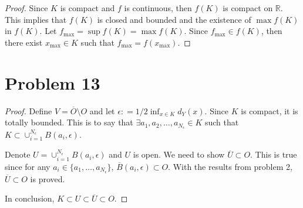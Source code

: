 \documentclass[12pt]{article}
\begin{document}
\begin{proof}

Since $K$ is compact and $f$ is continuous, then $f(K)$ is compact on $\mathbb R$. This implies that $f(K)$ is closed and bounded and the existence of $\max{f(K)}$ in $f(K)$. Let $f_{\text{max}} = \sup{f(K)} = \max {f(K)}$. Since $f_{\text{max}} \in f(K)$, then there exist $x_{\text{max}}\in K$ such that $f_{\text{max}} = f(x_{\text{max}})$. 

\end{proof}

\section*{Problem 13}

\begin{proof}

Define $V = \overline O \setminus O $ and let $\epsilon : = 1/2 \inf_{x\in K}{d_Y(x)}$. Since $K$ is compact, it is totally bounded. This is to say that $\exists a_1, a_2, \dots, a_{N_\epsilon}\in K$ such that $K \subset \cup_{i = 1}^{N_\epsilon} B(a_i, \epsilon)$. 

Denote $U = \cup_{i = 1}^{N_\epsilon} B(a_i, \epsilon)$ and $U$ is open. We need to show $\overline U \subset O$. This is true since for any $a_i\in \{a_1, \dots, a_{N_\epsilon}\}$, $\overline B(a_i, \epsilon) \subset O$. With the results from problem 2, $\overline U \subset O$ is proved.

In conclusion, $K\subset U\subset \overline U\subset O$.


\end{proof}
\end{document}

